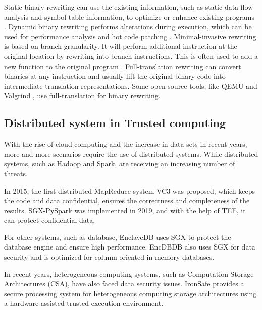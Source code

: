Static binary rewriting can use the existing information, such as static data flow analysis and
symbol table information, to optimize or enhance existing programs \cite{10.1145/2629335, Schwarz2007PLTOAL}.
Dynamic binary rewriting performs alterations during execution, which can be used for
performance analysis \cite{Luk2005PinBC} and hot code patching \cite{Bruening2003AnIF}.
Minimal-invasive rewriting is based on branch granularity. It will perform additional instruction
at the original location by rewriting into branch instructions. This is often used to add a new
function to the original program \cite{Federico2017revngAU}.
Full-translation rewriting can convert binaries at any instruction and usually lift the original
binary code into intermediate translation representations. Some open-source tools,
like QEMU \cite{Bellard2005QEMUAF} and Valgrind \cite{Nethercote2007ValgrindAF},
use full-translation for binary rewriting.


\subsection{Distributed system in Trusted computing}
With the rise of cloud computing and the increase in data sets in recent years,
more and more scenarios require the use of distributed systems.
While distributed systems, such as Hadoop and Spark, are receiving an increasing number
of threats.

In 2015, the first distributed MapReduce system VC3 \cite{Schuster2015VC3TD} was proposed,
which keeps the code and data confidential, ensures the correctness and completeness of the results.
SGX-PySpark \cite{Quoc2019SGXPySparkSD} was implemented in 2019, and with the help of TEE,
it can protect confidential data.

For other systems, such as database, EnclaveDB \cite{Priebe2018EnclaveDBAS} uses SGX to
protect the database engine and ensure high performance.
EncDBDB \cite{Fuhry2021EncDBDBSE} also uses SGX for data security and is optimized for
column-oriented in-memory databases.

In recent years, heterogeneous computing systems, such as Computation Storage Architectures (CSA),
have also faced data security issues.
IronSafe \cite{Unnibhavi2022SecureAP} provides a secure processing system for heterogeneous
computing storage architectures using a hardware-assisted trusted execution environment.